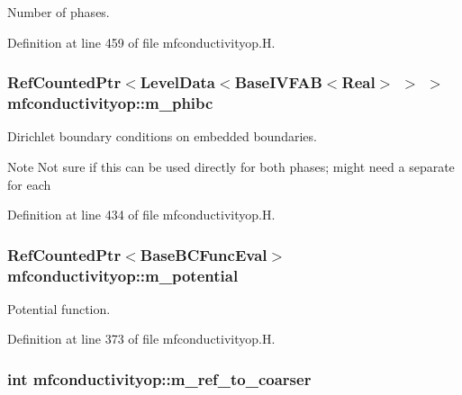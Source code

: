 Number of phases. 



Definition at line 459 of file mfconductivityop.\+H.

\subsubsection[{\texorpdfstring{m\+\_\+phibc}{m_phibc}}]{\setlength{\rightskip}{0pt plus 5cm}Ref\+Counted\+Ptr$<$Level\+Data$<$Base\+I\+V\+F\+AB$<$Real$>$ $>$ $>$ mfconductivityop\+::m\+\_\+phibc\hspace{0.3cm}{\ttfamily [protected]}}\hypertarget{classmfconductivityop_a344e21018863e2a1b4984a625af891c3}{}\label{classmfconductivityop_a344e21018863e2a1b4984a625af891c3}


Dirichlet boundary conditions on embedded boundaries. 

\begin{DoxyNote}{Note}
Not sure if this can be used directly for both phases; might need a separate for each 
\end{DoxyNote}


Definition at line 434 of file mfconductivityop.\+H.

\subsubsection[{\texorpdfstring{m\+\_\+potential}{m_potential}}]{\setlength{\rightskip}{0pt plus 5cm}Ref\+Counted\+Ptr$<$Base\+B\+C\+Func\+Eval$>$ mfconductivityop\+::m\+\_\+potential\hspace{0.3cm}{\ttfamily [protected]}}\hypertarget{classmfconductivityop_ad62deabff54ede30a117bfec47097095}{}\label{classmfconductivityop_ad62deabff54ede30a117bfec47097095}


Potential function. 



Definition at line 373 of file mfconductivityop.\+H.

\subsubsection[{\texorpdfstring{m\+\_\+ref\+\_\+to\+\_\+coarser}{m_ref_to_coarser}}]{\setlength{\rightskip}{0pt plus 5cm}int mfconductivityop\+::m\+\_\+ref\+\_\+to\+\_\+coarser\hspace{0.3cm}{\ttfamily [protected]}}\hypertarget{classmfconductivityop_a9045e6b84c21fda0b0ab77ff1f949553}{}\label{classmfconductivityop_a9045e6b84c21fda0b0ab77ff1f949553}


